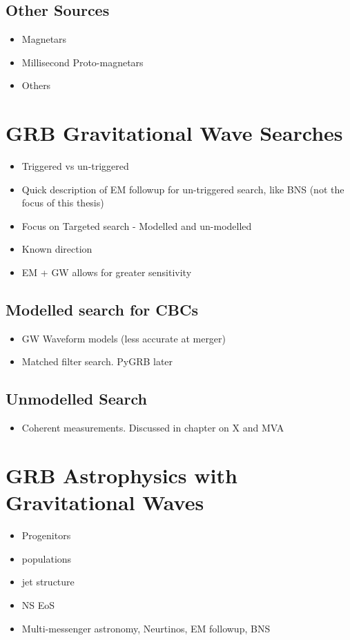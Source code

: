 \documentclass[12pt,twoside,a4paper]{report}
\begin{document}
\subsection{Other Sources}
\begin{itemize}
\item Magnetars
\item Millisecond Proto-magnetars
\item Others
\end{itemize}


\section{GRB Gravitational Wave Searches}
\begin{itemize}
\item Triggered vs un-triggered
\item Quick description of EM followup for un-triggered search, like BNS (not the focus of this thesis)
\item Focus on Targeted search - Modelled and un-modelled
\item Known direction
\item EM + GW allows for greater sensitivity
\end{itemize}
\subsection{Modelled search for CBCs}
\begin{itemize}
\item GW Waveform models (less accurate at merger)
\item Matched filter search. PyGRB later
\end{itemize}
\subsection{Unmodelled Search}
\begin{itemize}
\item Coherent measurements. Discussed in chapter on X and MVA
\end{itemize}

\section{GRB Astrophysics with Gravitational Waves}
\begin{itemize}
\item Progenitors
\item populations
\item jet structure 
\item NS EoS
\item Multi-messenger astronomy, Neurtinos, EM followup, BNS
\end{itemize}
\end{document}
